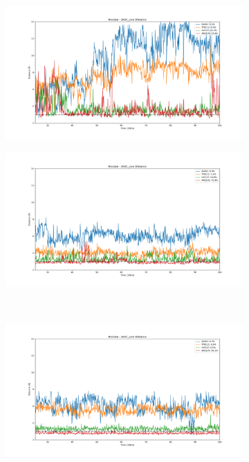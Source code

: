 \documentclass[fleqn,10pt]{wlscirep}
\begin{document}
\begin{figure}[!ht]
\centering
   \begin{subfigure}{.45\textwidth}
     \centering
     \includegraphics[width=.95\linewidth]{2AZC_canc/2AZC_canc-dist_0.png}
   \end{subfigure}
   \begin{subfigure}{.45\textwidth}
     \centering
     \includegraphics[width=.95\linewidth]{2AZC_canc/2AZC_canc-dist_1.png}
   \end{subfigure}
   \\
   \begin{subfigure}{.45\textwidth}
     \centering
     \includegraphics[width=.95\linewidth]{2AZC_canc/2AZC_canc-dist_2.png}

\end{subfigure}
\end{figure}
\end{document}
